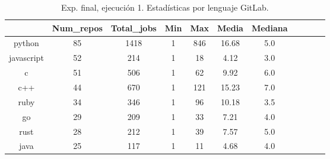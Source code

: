 \begin{table}[h]
  \centering
  \caption{Exp. final, ejecución 1. Estadísticas por lenguaje GitLab.}
  \label{tab:tabla_f_1_6}

\begin{footnotesize}
\renewcommand{\arraystretch}{1.5} %
\begin{tabular}{ccccccccccc}
  \hline
  {} &  Num\_repos &  Total\_jobs &  Min &  Max &  Media &  Mediana \\
  \hline
  python           &         85 &        1418 &    1 &  846 &  16.68 &      5.0 \\
  javascript       &         52 &         214 &    1 &   18 &   4.12 &      3.0 \\
  c                &         51 &         506 &    1 &   62 &   9.92 &      6.0 \\
  c++              &         44 &         670 &    1 &  121 &  15.23 &      7.0 \\
  ruby             &         34 &         346 &    1 &   96 &  10.18 &      3.5 \\
  go               &         29 &         209 &    1 &   33 &   7.21 &      4.0 \\
  rust             &         28 &         212 &    1 &   39 &   7.57 &      5.0 \\
  java             &         25 &         117 &    1 &   11 &   4.68 &      4.0 \\

\end{tabular}
\end{footnotesize}
\end{table}
